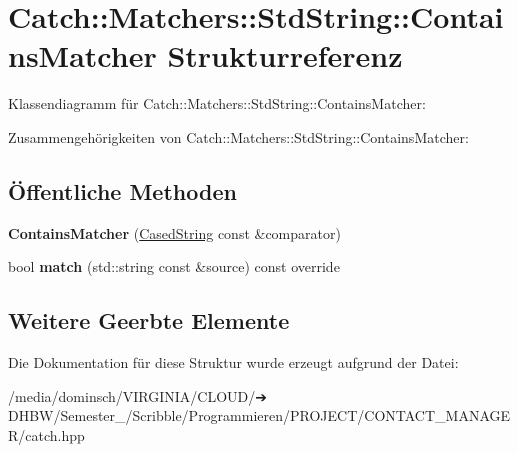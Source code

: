 \hypertarget{structCatch_1_1Matchers_1_1StdString_1_1ContainsMatcher}{}\section{Catch\+:\+:Matchers\+:\+:Std\+String\+:\+:Contains\+Matcher Strukturreferenz}
\label{structCatch_1_1Matchers_1_1StdString_1_1ContainsMatcher}


Klassendiagramm für Catch\+:\+:Matchers\+:\+:Std\+String\+:\+:Contains\+Matcher\+:


Zusammengehörigkeiten von Catch\+:\+:Matchers\+:\+:Std\+String\+:\+:Contains\+Matcher\+:
\subsection*{Öffentliche Methoden}
\begin{DoxyCompactItemize}
\item 
\mbox{\label{structCatch_1_1Matchers_1_1StdString_1_1ContainsMatcher_acc892883c8409e34b28c9b39d4ef1fe3}} 
{\bfseries Contains\+Matcher} (\hyperlink{structCatch_1_1Matchers_1_1StdString_1_1CasedString}{Cased\+String} const \&comparator)
\item 
\mbox{\label{structCatch_1_1Matchers_1_1StdString_1_1ContainsMatcher_a630628b234b037be83fe587081a80b53}} 
bool {\bfseries match} (std\+::string const \&source) const override
\end{DoxyCompactItemize}
\subsection*{Weitere Geerbte Elemente}


Die Dokumentation für diese Struktur wurde erzeugt aufgrund der Datei\+:\begin{DoxyCompactItemize}
\item 
/media/dominsch/\+V\+I\+R\+G\+I\+N\+I\+A/\+C\+L\+O\+U\+D/➔ D\+H\+B\+W/\+Semester\+\_/\+Scribble/\+Programmieren/\+P\+R\+O\+J\+E\+C\+T/\+C\+O\+N\+T\+A\+C\+T\+\_\+\+M\+A\+N\+A\+G\+E\+R/catch.\+hpp\end{DoxyCompactItemize}

